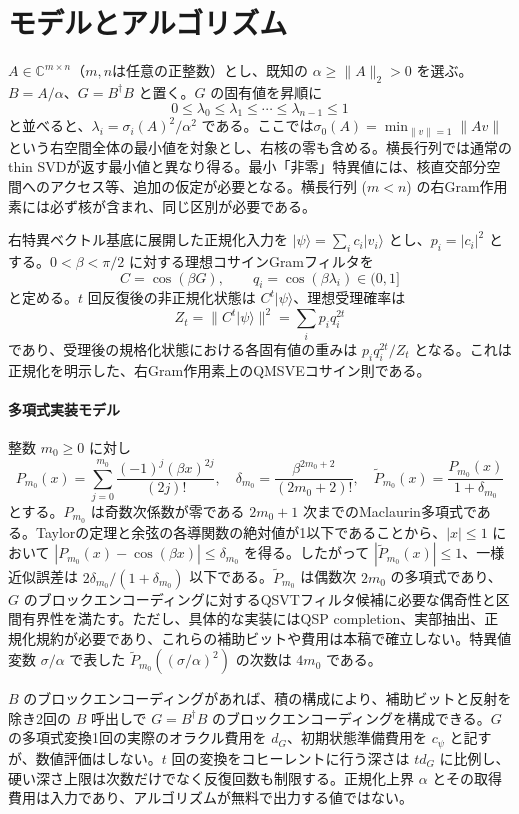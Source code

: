 \documentclass[11pt,a4paper]{article}
\newcommand{\C}{\mathbb{C}}
\newcommand{\ket}[1]{\lvert #1\rangle}
\begin{document}
{\section{モデルとアルゴリズム}
$A\in\C^{m\times n}$（$m,n$は任意の正整数）とし、既知の $\alpha\geq\|A\|_2>0$ を選ぶ。$B=A/\alpha$、$G=B^\dagger B$ と置く。$G$ の固有値を昇順に
\[
 0\leq\lambda_0\leq\lambda_1\leq\cdots\leq\lambda_{n-1}\leq1
\]
と並べると、$\lambda_i=\sigma_i(A)^2/\alpha^2$ である。ここでは$\sigma_0(A)=\min_{\|v\|=1}\|Av\|$という右空間全体の最小値を対象とし、右核の零も含める。横長行列では通常のthin SVDが返す最小値と異なり得る。最小「非零」特異値には、核直交部分空間へのアクセス等、追加の仮定が必要となる。横長行列 ($m<n$) の右Gram作用素には必ず核が含まれ、同じ区別が必要である。

右特異ベクトル基底に展開した正規化入力を $\ket{\psi}=\sum_i c_i\ket{v_i}$ とし、$p_i=|c_i|^2$ とする。$0<\beta<\pi/2$ に対する理想コサインGramフィルタを
\[
 C=\cos(\beta G),\qquad q_i=\cos(\beta\lambda_i)\in(0,1]
\]
と定める。$t$ 回反復後の非正規化状態は $C^t\ket{\psi}$、理想受理確率は
\[
 Z_t=\|C^t\ket{\psi}\|^2=\sum_i p_iq_i^{2t}
\]
であり、受理後の規格化状態における各固有値の重みは $p_iq_i^{2t}/Z_t$ となる。これは正規化を明示した、右Gram作用素上のQMSVEコサイン則である。

\paragraph{多項式実装モデル}
整数 $m_0\geq0$ に対し
\[
 P_{m_0}(x)=\sum_{j=0}^{m_0}\frac{(-1)^j(\beta x)^{2j}}{(2j)!},\quad
 \delta_{m_0}=\frac{\beta^{2m_0+2}}{(2m_0+2)!},\quad
 \widetilde P_{m_0}(x)=\frac{P_{m_0}(x)}{1+\delta_{m_0}}
\]
とする。$P_{m_0}$ は奇数次係数が零である $2m_0+1$ 次までのMaclaurin多項式である。Taylorの定理と余弦の各導関数の絶対値が1以下であることから、$|x|\leq1$ において $|P_{m_0}(x)-\cos(\beta x)|\leq\delta_{m_0}$ を得る。したがって $|\widetilde P_{m_0}(x)|\leq1$、一様近似誤差は $2\delta_{m_0}/(1+\delta_{m_0})$ 以下である。$\widetilde P_{m_0}$ は偶数次 $2m_0$ の多項式であり、$G$ のブロックエンコーディングに対するQSVTフィルタ候補に必要な偶奇性と区間有界性を満たす\cite{Gilyen}。ただし、具体的な実装にはQSP completion、実部抽出、正規化規約が必要であり、これらの補助ビットや費用は本稿で確立しない。特異値変数 $\sigma/\alpha$ で表した $\widetilde P_{m_0}((\sigma/\alpha)^2)$ の次数は $4m_0$ である。

$B$ のブロックエンコーディングがあれば、積の構成により、補助ビットと反射を除き2回の $B$ 呼出しで $G=B^\dagger B$ のブロックエンコーディングを構成できる。$G$ の多項式変換1回の実際のオラクル費用を $d_G$、初期状態準備費用を $c_\psi$ と記すが、数値評価はしない。$t$ 回の変換をコヒーレントに行う深さは $t d_G$ に比例し、硬い深さ上限は次数だけでなく反復回数も制限する。正規化上界 $\alpha$ とその取得費用は入力であり、アルゴリズムが無料で出力する値ではない。

}
\end{document}
